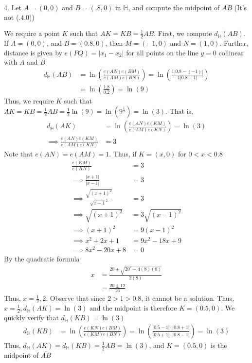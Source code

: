 \documentclass{report}
\begin{document}
    \pagebreak \bigbreak \noindent 
    \begin{mdframed}
        4. Let $A = (0,0)$ and $B = (.8,0)$ in $\mathbb{H}$, and compute the midpoint of $\overline{AB}$ (It's not (.4,0))
    \end{mdframed}
    \bigbreak \noindent 
    We require a point $K$ such that $AK = KB = \frac{1}{2}AB$. First, we compute $d_{\mathbb{H}}(AB)$. If $A = (0,0) $, and $B = (0.8,0)$, then $M = (-1,0)$ and $N = (1,0)$. Further, distance is given by $e(PQ) = \left\lvert x_{1} - x_{2} \right\rvert $ for all points on the line $y = 0$ collinear with $A$ and $B$
    \begin{align*}
        d_{\mathbb{H}}(AB) &= \ln{\left(\frac{e(AN)e(BM)}{e(AM)e(BN)}\right)} = \ln{\left(\frac{1\left\lvert 0.8-(-1) \right\rvert}{1\left\lvert 0.8-1 \right\rvert}\right)} \\
        &= \ln{\left(\frac{1.8}{0.2}\right)} = \ln{\left(9\right)}
    \end{align*}
    Thus, we require $K$ such that $AK = KB = \frac{1}{2}AB = \frac{1}{2}\ln{\left(9\right)}  = \ln{\left(9^{\frac{1}{2}}\right)} = \ln{\left(3\right)}$. That is,
    \begin{align*}
        d_{\mathbb{H}}(AK) &= \ln{\left(\frac{e(AN)e(KM)}{e(AM)e(KN)}\right)} = \ln{\left(3\right)} \\
        \implies \frac{e(AN)e(KM)}{e(AM)e(KN)} &= 3
    \end{align*}
    Note that $e(AN) = e(AM) = 1$. Thus, if $K = (x,0)$ for $ 0 < x < 0.8 $
    \begin{align*}
        \frac{e(KM)}{e(KN)} &= 3 \\
        \implies \frac{\left\lvert x+1 \right\rvert}{\left\lvert x-1 \right\rvert} &= 3 \\
        \implies \frac{\sqrt{(x+1)^{2}}}{\sqrt{x-1}^{2}} &= 3 \\
        \implies \sqrt{(x+1)^{2}} &= 3\sqrt{(x-1)^{2}} \\
        \implies (x+1)^{2} &= 9(x-1)^{2} \\
        \implies x^{2} + 2x + 1 &= 9x^{2} -18x + 9 \\
        \implies 8x^{2} - 20x + 8 &= 0
    \end{align*}
    By the quadratic formula
    \begin{align*}
        x &= \frac{20 \pm \sqrt{20^{2} - 4(8)(8)}}{2(8)} \\
          &= \frac{20\pm 12}{16}
    \end{align*}
    Thus, $x = \frac{1}{2}, 2$. Observe that since $2 > 1 > 0.8$, it cannot be a solution. Thus, $x = \frac{1}{2}, d_{\mathbb{H}}(AK) = \ln{\left(3\right)}$ and the midpoint is therefore $K = (0.5,0)$. We quickly verify that $d_{\mathbb{H}}(KB) = \ln{\left(3\right)}$
    \begin{align*}
        d_{\mathbb{H}}(KB) &= \ln{\left(\frac{e(KN)e(BM)}{e(KM)e(BN)}\right)} = \ln{\left(\frac{\left\lvert 0.5-1 \right\rvert \cdot \left\lvert 0.8 + 1 \right\rvert}{\left\lvert 0.5 + 1 \right\rvert\cdot  \left\lvert 0.8 - 1 \right\rvert} \right)} = \ln{\left(3\right)}
    \end{align*}
    Thus, $d_{\mathbb{H}}(AK) = d_{\mathbb{H}}(KB) = \frac{1}{2}AB = \ln{\left(3\right)} $, and $K = (0.5,0)$ is the midpoint of $\overline{AB} $
\end{document}
